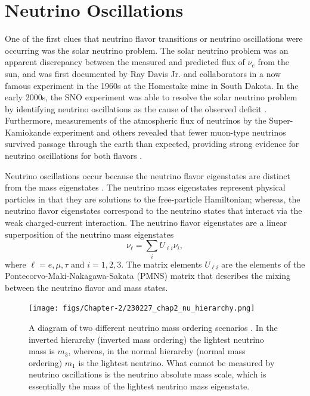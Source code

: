 \section{Neutrino Oscillations}
\label{sec:chap2-nu-oscillation}

One of the first clues that neutrino flavor transitions or neutrino oscillations were occurring was the solar neutrino problem. The solar neutrino problem was an apparent discrepancy between the measured and predicted flux of $\nu_e$ from the sun, and was first documented by Ray Davis Jr. and collaborators in a now famous experiment in the 1960s \cite{ray_davis} at the Homestake mine in South Dakota. In the early 2000s, the SNO experiment was able to resolve the solar neutrino problem by identifying neutrino oscillations as the cause of the observed deficit \cite{SNO}. Furthermore, measurements of the atmospheric flux of neutrinos by the Super-Kamiokande experiment and others revealed that fewer muon-type neutrinos survived passage through the earth than expected, providing strong evidence for neutrino oscillations for both flavors \cite{superk}.

Neutrino oscillations occur because the neutrino flavor eigenstates are distinct from the mass eigenstates \cite{nu_oscillations}. The neutrino mass eigenstates represent physical particles in that they are solutions to the free-particle Hamiltonian; whereas, the neutrino flavor eigenstates correspond to the neutrino states that interact via the weak charged-current interaction. The neutrino flavor eigenstates are a linear superposition of the neutrino mass eigenstates
\begin{equation}
    \nu_\ell=\sum_i{U_{\ell i}\nu_i},
\end{equation}
where $\ell=e,\mu,\tau$ and $i=1,2,3$. The matrix elements $U_{\ell i}$ are the elements of the Pontecorvo-Maki-Nakagawa-Sakata (PMNS) matrix that describes the mixing between the neutrino flavor and mass states.

\begin{figure}[htbp]
    \centering
    \texttt{[image: figs/Chapter-2/230227\_chap2\_nu\_hierarchy.png]}
    \caption{A diagram of two different neutrino mass ordering scenarios \cite{nu_mass_ordering_figure_inspiration}. In the inverted hierarchy (inverted mass ordering) the lightest neutrino mass is $m_3$, whereas, in the normal hierarchy (normal mass ordering) $m_1$ is the lightest neutrino. What cannot be measured by neutrino oscillations is the neutrino absolute mass scale, which is essentially the mass of the lightest neutrino mass eigenstate.}
    \label{fig:chap2-nu-hierarchy}
\end{figure}


